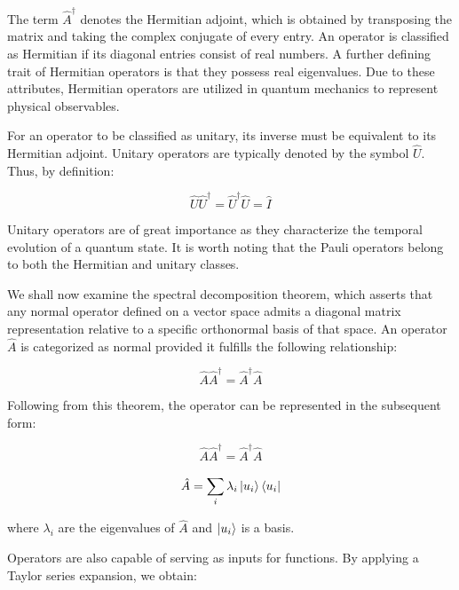 \documentclass[en]{dimscthesis}
\begin{document}
The term $\hat{A}^\dagger$ denotes the Hermitian adjoint, which is obtained by transposing the matrix and taking the complex conjugate of every entry. An operator is classified as Hermitian if its diagonal entries consist of real numbers. A further defining trait of Hermitian operators is that they possess real eigenvalues. Due to these attributes, Hermitian operators are utilized in quantum mechanics to represent physical observables.

For an operator to be classified as unitary, its inverse must be equivalent to its Hermitian adjoint. Unitary operators are typically denoted by the symbol $\hat{U}$. Thus, by definition:

\begin{equation}
	\hat{U}\hat{U}^\dagger =\hat{U}^\dagger\hat{U} = \hat{I}
	\label{eq:matrix_U_dagger}
\end{equation}

Unitary operators are of great importance as they characterize the temporal evolution of a quantum state. It is worth noting that the Pauli operators belong to both the Hermitian and unitary classes.

We shall now examine the spectral decomposition theorem, which asserts that any normal operator defined on a vector space admits a diagonal matrix representation relative to a specific orthonormal basis of that space. An operator $\hat{A}$ is categorized as normal provided it fulfills the following relationship:

\begin{equation}
	\hat{A}\hat{A}^\dagger =\hat{A}^\dagger\hat{A}
	\label{eq:matrix_normal}
\end{equation}

Following from this theorem, the operator can be represented in the subsequent form:

\begin{equation}
	\hat{A}\hat{A}^\dagger =\hat{A}^\dagger\hat{A}
	\label{eq:infite_sum}
\end{equation}

\begin{equation}
	\hat{A} = \sum_{i}^{} \lambda_i \ket{u_i}\bra{u_i}
	\label{eq:finite_sum}
\end{equation}

where $\lambda_i$ are the eigenvalues of $\hat{A}$ and $\ket{u_i}$ is a basis.

Operators are also capable of serving as inputs for functions. By applying a Taylor series expansion, we obtain:
\end{document}
